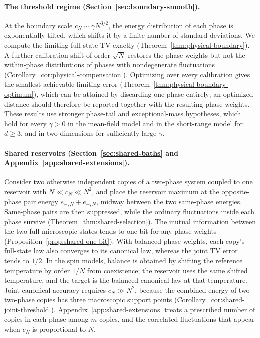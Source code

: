 \paragraph{The threshold regime (Section~\ref{sec:boundary-smooth}).}
At the boundary scale $c_N\sim\gamma N^{3/2}$, the energy distribution
of each phase is exponentially tilted, which shifts it by a finite
number of standard deviations. We compute the limiting full-state TV
exactly (Theorem~\ref{thm:physical-boundary}). A further calibration
shift of order $\sqrt N$ restores the phase weights but not the
within-phase distributions of phases with nondegenerate fluctuations
(Corollary~\ref{cor:physical-compensation}).
Optimizing over every calibration gives the smallest achievable
limiting error (Theorem~\ref{thm:physical-boundary-optimum}), which can
be attained by discarding one phase entirely; an optimized distance
should therefore be reported together with the resulting phase weights.
These results use stronger phase-tail and exceptional-mass hypotheses,
which hold for every $\gamma>0$ in the mean-field model and in the
short-range model for $d\ge3$, and in two dimensions for sufficiently
large $\gamma$.

\paragraph{Shared reservoirs (Section~\ref{sec:shared-baths} and
Appendix~\ref{app:shared-extensions}).}
Consider two otherwise independent copies of a two-phase system coupled
to one reservoir with $N\ll c_N\ll N^2$, and place the reservoir maximum
at the opposite-phase pair energy $e_{-,N}+e_{+,N}$, midway between the
two same-phase energies. Same-phase pairs are then suppressed, while
the ordinary fluctuations inside each phase survive
(Theorem~\ref{thm:shared-selection}). The mutual information between the
two full microscopic states tends to one bit for any phase weights
(Proposition~\ref{prop:shared-one-bit}). With balanced phase weights,
each copy's full-state law also converges to its canonical law, whereas
the joint TV error tends to $1/2$. In the spin models, balance is
obtained by shifting the reference temperature by order $1/N$ from
coexistence; the reservoir uses the same shifted temperature, and the
target is the balanced canonical law at that temperature. Joint
canonical accuracy requires $c_N\gg N^2$, because the combined energy of
two two-phase copies has three macroscopic support points
(Corollary~\ref{cor:shared-joint-threshold}).
Appendix~\ref{app:shared-extensions} treats a prescribed number of
copies in each phase among $m$ copies, and the correlated fluctuations
that appear when $c_N$ is proportional to $N$.

